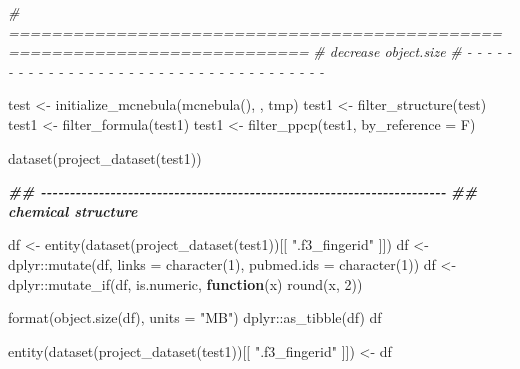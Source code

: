 \documentclass[
]{article}
\newenvironment{Shaded}{\begin{snugshade}}{\end{snugshade}}
\newcommand{\AttributeTok}[1]{\textcolor[rgb]{0.77,0.63,0.00}{#1}}
\newcommand{\CommentTok}[1]{\textcolor[rgb]{0.56,0.35,0.01}{\textit{#1}}}
\newcommand{\ControlFlowTok}[1]{\textcolor[rgb]{0.13,0.29,0.53}{\textbf{#1}}}
\newcommand{\DecValTok}[1]{\textcolor[rgb]{0.00,0.00,0.81}{#1}}
\newcommand{\DocumentationTok}[1]{\textcolor[rgb]{0.56,0.35,0.01}{\textbf{\textit{#1}}}}
\newcommand{\FunctionTok}[1]{\textcolor[rgb]{0.00,0.00,0.00}{#1}}
\newcommand{\NormalTok}[1]{#1}
\newcommand{\OtherTok}[1]{\textcolor[rgb]{0.56,0.35,0.01}{#1}}
\newcommand{\SpecialCharTok}[1]{\textcolor[rgb]{0.00,0.00,0.00}{#1}}
\newcommand{\StringTok}[1]{\textcolor[rgb]{0.31,0.60,0.02}{#1}}
\begin{document}
\begin{Shaded}
\begin{Highlighting}[]
\CommentTok{\# ==========================================================================}
\CommentTok{\# decrease object.size}
\CommentTok{\# {-} {-} {-} {-} {-} {-} {-} {-} {-} {-} {-} {-} {-} {-} {-} {-} {-} {-} {-} {-} {-} {-} {-} {-} {-} {-} {-} {-} {-} {-} {-} {-} {-} {-} {-} {-} {-}}

\NormalTok{test }\OtherTok{\textless{}{-}} \FunctionTok{initialize\_mcnebula}\NormalTok{(}\FunctionTok{mcnebula}\NormalTok{(), , tmp)}
\NormalTok{test1 }\OtherTok{\textless{}{-}} \FunctionTok{filter\_structure}\NormalTok{(test)}
\NormalTok{test1 }\OtherTok{\textless{}{-}} \FunctionTok{filter\_formula}\NormalTok{(test1)}
\NormalTok{test1 }\OtherTok{\textless{}{-}} \FunctionTok{filter\_ppcp}\NormalTok{(test1, }\AttributeTok{by\_reference =}\NormalTok{ F)}

\FunctionTok{dataset}\NormalTok{(}\FunctionTok{project\_dataset}\NormalTok{(test1))}

\DocumentationTok{\#\# {-}{-}{-}{-}{-}{-}{-}{-}{-}{-}{-}{-}{-}{-}{-}{-}{-}{-}{-}{-}{-}{-}{-}{-}{-}{-}{-}{-}{-}{-}{-}{-}{-}{-}{-}{-}{-}{-}{-}{-}{-}{-}{-}{-}{-}{-}{-}{-}{-}{-}{-}{-}{-}{-}{-}{-}{-}{-}{-}{-}{-}{-}{-}{-}{-}{-}{-}{-}{-}{-} }
\DocumentationTok{\#\# chemical structure}

\NormalTok{df }\OtherTok{\textless{}{-}} \FunctionTok{entity}\NormalTok{(}\FunctionTok{dataset}\NormalTok{(}\FunctionTok{project\_dataset}\NormalTok{(test1))[[ }\StringTok{".f3\_fingerid"}\NormalTok{ ]])}
\NormalTok{df }\OtherTok{\textless{}{-}}\NormalTok{ dplyr}\SpecialCharTok{::}\FunctionTok{mutate}\NormalTok{(df, }\AttributeTok{links =} \FunctionTok{character}\NormalTok{(}\DecValTok{1}\NormalTok{), }\AttributeTok{pubmed.ids =} \FunctionTok{character}\NormalTok{(}\DecValTok{1}\NormalTok{))}
\NormalTok{df }\OtherTok{\textless{}{-}}\NormalTok{ dplyr}\SpecialCharTok{::}\FunctionTok{mutate\_if}\NormalTok{(df, is.numeric, }\ControlFlowTok{function}\NormalTok{(x) }\FunctionTok{round}\NormalTok{(x, }\DecValTok{2}\NormalTok{))}

\FunctionTok{format}\NormalTok{(}\FunctionTok{object.size}\NormalTok{(df), }\AttributeTok{units =} \StringTok{"MB"}\NormalTok{)}
\NormalTok{dplyr}\SpecialCharTok{::}\FunctionTok{as\_tibble}\NormalTok{(df)}
\NormalTok{df}

\FunctionTok{entity}\NormalTok{(}\FunctionTok{dataset}\NormalTok{(}\FunctionTok{project\_dataset}\NormalTok{(test1))[[ }\StringTok{".f3\_fingerid"}\NormalTok{ ]]) }\OtherTok{\textless{}{-}}\NormalTok{ df}


\end{Highlighting}
\end{Shaded}
\end{document}
